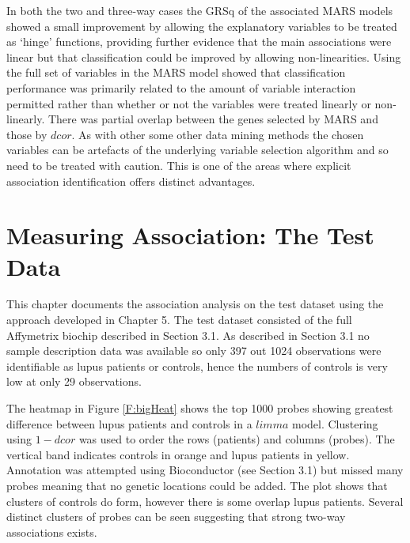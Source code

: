 \documentclass[a4paper, 12pt]{report}
\begin{document}
In both the two and three-way cases the GRSq of the associated MARS models showed a small improvement by allowing the explanatory variables to be treated as `hinge' functions, providing further evidence that the main associations were linear but that classification could be improved by allowing non-linearities. Using the full set of variables in the MARS model showed that classification performance was primarily related to the amount of variable interaction permitted rather than whether or not the variables were treated linearly or non-linearly. There was partial overlap between the genes selected by MARS and those by $dcor$. As with other some other data mining methods the chosen variables can be artefacts of the underlying variable selection algorithm and so need to be treated with caution. This is one of the areas where explicit association identification offers distinct advantages.

\chapter{Measuring Association: The Test Data}
This chapter documents the association analysis on the test dataset using the approach developed in Chapter 5. The test dataset consisted of the full Affymetrix biochip described in Section 3.1. As described in Section 3.1 no sample description data was available so only 397 out 1024 observations were identifiable as lupus patients or controls, hence the numbers of controls is very low at only 29 observations.

The heatmap in Figure \ref{F:bigHeat} shows the top 1000 probes showing greatest difference between lupus patients and controls in a $limma$ model. Clustering using $1 - dcor$ was used to order the rows (patients) and columns (probes). The vertical band indicates controls in orange and lupus patients in yellow. Annotation was attempted using Bioconductor (see Section 3.1) but missed many probes meaning that no genetic locations could be added. The plot shows that clusters of controls do form, however there is some overlap lupus patients. Several distinct clusters of probes can be seen suggesting that strong two-way associations exists.
\end{document}
